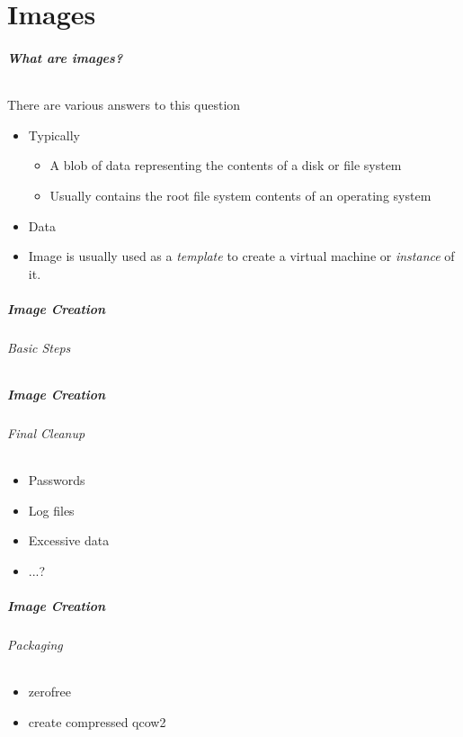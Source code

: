 \part{Images}

\begin{frame}
\frametitle{What are images?}
\framesubtitle{}
There are various answers to this question
\begin{itemize}
\item Typically
  \begin{itemize}
  \item A blob of data representing the contents of a disk or file system
  \item Usually contains the root file system contents of an operating system
  \end{itemize}
\item Data
\item Image is usually used as a \emph{template} to create a virtual
  machine or \emph{instance} of it.
\end{itemize}
\end{frame}

\begin{frame}
\frametitle{Image Creation}
\framesubtitle{Basic Steps}

\end{frame}

\begin{frame}
\frametitle{Image Creation}
\framesubtitle{Final Cleanup}
\begin{itemize}
\item Passwords
\item Log files
\item Excessive data
\item ...?
\end{itemize}
\end{frame}

\begin{frame}
\frametitle{Image Creation}
\framesubtitle{Packaging}
\begin{itemize}
\item zerofree
\item create compressed qcow2
\end{itemize}
\end{frame}


